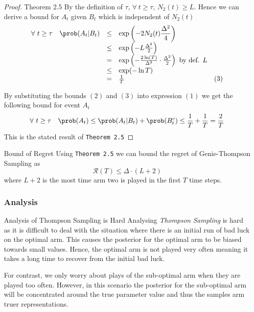 \documentclass[11pt,a4paper]{article}
\begin{document}
\begin{proof}{Theorem 2.5}
    By the definition of $\tau$, $\forall\ t\geq\tau,\ N_2(t)\geq L$. Hence we can derive a bound for $A_t$ given $B_t$ which is independent of $N_2(t)$
    \[\begin{array}{rrcll}
      \forall\ t\geq\tau&\prob(A_t|B_t)&\leq&\exp\left(-2N_2(t)\dfrac{\Delta^2}4\right)\\
      &&\leq&\exp\left(-L\frac{\Delta^2}2\right)\\
      &&=&\exp\left(-\frac{2\ln(T)}{\Delta^2}\cdot\frac{\Delta^2}2\right)\text{ by def. }L\\
      &&\leq&\exp(-\ln T)\\
      &&=&\frac1T&(3)
    \end{array}\]
    \par By substituting the bounds $(2)$ and $(3)$ into expression $(1)$ we get the following bound for event $A_t$
    \[ \forall\ t\geq\tau\quad\prob(A_t)\leq\prob(A_t|B_t)+\prob(B_t^c)\leq\frac1T+\frac1T=\frac2T \]
    This is the stated result of \texttt{Theorem 2.5} \proved
  \end{proof}

  \begin{proposition}{Bound of Regret}
    Using \texttt{Theorem 2.5} we can bound the regret of Genie-Thompson Sampling as
    \[ \mathcal{R}(T)\leq\Delta\cdot(L+2) \]
    where $L+2$ is the most time arm two is played in the first $T$ time steps.
  \end{proposition}

\subsubsection{Analysis}

  \begin{remark}{Analysis of Thompson Sampling is Hard}
    Analysing \textit{Thompson Sampling} is hard as it is difficult to deal with the situation where there is an initial run of bad luck on the optimal arm. This causes the posterior for the optimal arm to be biased towards small values. Hence, the optimal arm is not played very often meaning it takes a long time to recover from the initial bad luck.
    \par For contrast, we only worry about plays of the sub-optimal arm when they are played too often. However, in this scenario the posterior for the sub-optimal arm will be concentrated around the true parameter value and thus the samples arm truer representations.
  \end{remark}
\end{document}
